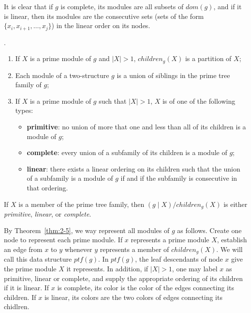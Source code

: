 It is clear that if $g$ is complete, its modules are all subsets of $dom(g)$, and if it is linear, then its modules are the consecutive sets (sets of the form $\{x_i, x_{i+1}, \dots, x_j\}$) in the linear order on its nodes.

\begin{mytheo}
    \label{thm:2-5}
    .\\
    \begin{enumerate}
        \item If $X$ is a prime module of $g$ and $\mid X \mid > 1$, $children_g(X)$ is a partition of $X$;
        \item Each module of a two-structure $g$ is a union of siblings in the prime tree family of $g$;
        \item If $X$ is a prime module of $g$ such that $\mid X \mid > 1$, $X$ is of one of the following types:
            \begin{itemize}
                \item \textbf{primitive}: no union of more that one and less than all of its children is a module of $g$;
                \item \textbf{complete}: every union of a subfamily of its children is a module of $g$;
                \item \textbf{linear}: there exists a linear ordering on its children such that the union of a subfamily is a module of $g$ if and if the subfamily is consecutive in that ordering.
            \end{itemize}
    \end{enumerate}
\end{mytheo}

\begin{mycor}
    \label{cor:2}
    If $X$ is a member of the prime tree family, then $(g \mid X) / children_g(X)$ is either \textit{primitive}, \textit{linear}, or \textit{complete}.
\end{mycor}

By Theorem~\ref{thm:2-5}, we way represent all modules of $g$ as follows.
Create one node to represent each prime module.
If $x$ represents a prime module $X$, establish an edge from $x$ to $y$ whenever $y$ represents a member of $children_g(X)$.
We will call this data structure $ptf(g)$.
In $ptf(g)$, the leaf descendants of node $x$ give the prime module $X$ it represents.
In addition, if $\mid X \mid > 1$, one may label $x$ as primitive, linear or complete, and supply the appropriate ordering of its children if it is linear.
If $x$ is complete, its color is the color of the edges connecting its children.
If $x$ is linear, its colors are the two colors of edges connecting its chidlren.

